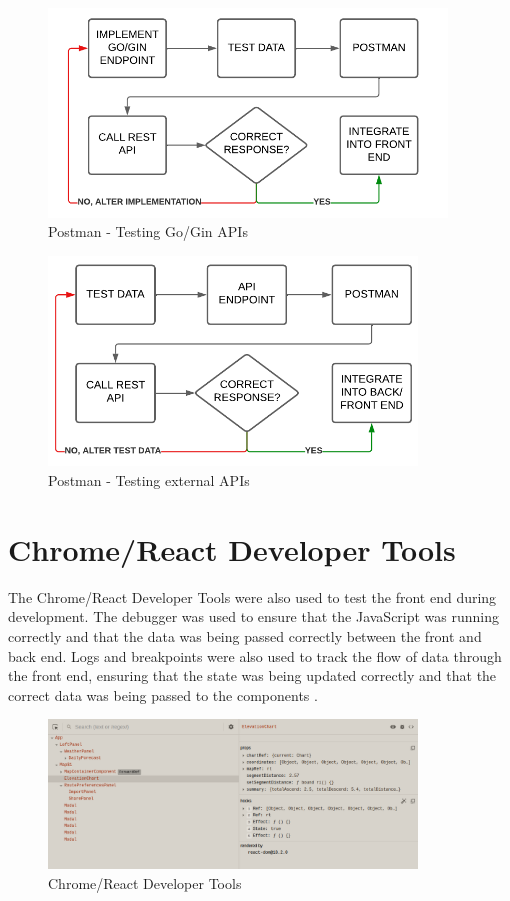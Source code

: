 \begin{figure}[!ht]
  \centering
  \includegraphics[width=400px]{figures/postman-testing-go.pdf}
  \caption{Postman - Testing Go/Gin APIs}
  \label{fig:postman-go}
\end{figure}

\begin{figure}[!ht]
  \centering
  \includegraphics[width=370px]{figures/postman-testing.pdf}
  \caption{Postman - Testing external APIs}
  \label{fig:postman-external}
\end{figure}

\clearpage
\section{Chrome/React Developer Tools}
\label{testing:chrome-dev}

The Chrome/React Developer Tools were also used to test the front end during development. The debugger was used to ensure that the JavaScript was running correctly and that the data was being passed correctly between the front and back end. Logs and breakpoints were also used to track the flow of data through the front end, ensuring that the state was being updated correctly and that the correct data was being passed to the components .

\begin{figure}[!ht]
  \centering
  \includegraphics[width=370px]{figures/chrome-dev-tools-react.png}
  \caption{Chrome/React Developer Tools}
  \label{fig:dev-tools}
\end{figure}

